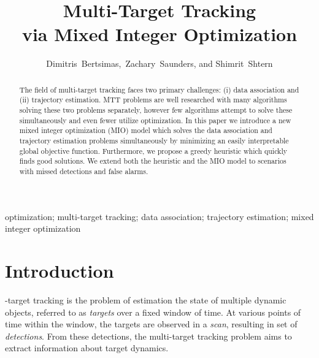 \documentclass[journal]{IEEEtran}
\begin{document}
\title{Multi-Target Tracking\\ via Mixed Integer Optimization}


\author{Dimitris~Bertsimas,~Zachary~Saunders, and Shimrit~Shtern}

\maketitle

\begin{abstract}
The field of multi-target tracking faces two primary challenges: (i) data association and (ii) trajectory estimation. MTT problems are well researched with many algorithms solving these two problems separately, however few algorithms attempt to solve these simultaneously and even fewer utilize optimization. In this paper we introduce a new mixed integer optimization (MIO) model which solves the data association and trajectory estimation problems simultaneously by minimizing an easily interpretable global objective function. Furthermore, we propose a greedy heuristic which quickly finds good solutions. We extend both the heuristic and the MIO model to scenarios with missed detections and false alarms. 
\end{abstract}

\begin{IEEEkeywords}
optimization; multi-target tracking; data association; trajectory estimation; mixed integer optimization 
\end{IEEEkeywords}

\section{Introduction}\label{sec: Intro}
-target tracking is the problem of estimation the state of multiple dynamic objects, referred to as \textit{targets} over a fixed window of time. At various points of time within the window, the targets are observed in a \textit{scan}, resulting in set of \textit{detections}. From these detections, the multi-target tracking problem aims to extract information about target dynamics. 
\end{document}
